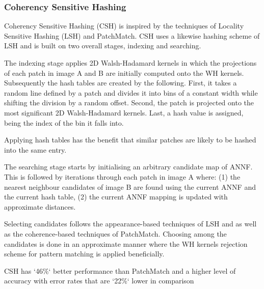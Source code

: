 \subsubsection{Coherency Sensitive Hashing}
Coherency Sensitive Hashing (CSH) is inspired by the techniques of Locality Sensitive Hashing (LSH) and PatchMatch. CSH uses a likewise hashing scheme of LSH and is built on two overall stages, indexing and searching. 

The indexing stage applies 2D Walsh-Hadamard kernels in which the projections of each patch in image A and B are initially computed onto the WH kernels. Subsequently the hash tables are created by the following. First, it takes a random line defined by a patch and divides it into bins of a constant width while shifting the division by a random offset. Second, the patch is projected onto the most significant 2D Walsh-Hadamard kernels. Last, a hash value is assigned, being the index of the bin it falls into. 

Applying hash tables has the benefit that similar patches are likely to be hashed into the same entry. 

The searching stage starts by initialising an arbitrary candidate map of ANNF. This is followed by iterations through each patch in image A where: (1) the nearest neighbour candidates of image B are found using the current ANNF and the current hash table, (2) the current ANNF mapping is updated with approximate distances. 

Selecting candidates follows the appearance-based techniques of LSH and as well as the coherence-based techniques of PatchMatch. Choosing among the candidates is done in an approximate manner where the WH kernels rejection scheme for pattern matching is applied beneficially. 

CSH has `46\%` better performance than PatchMatch and a higher level of accuracy with error rates that are `22\%` lower in comparison






